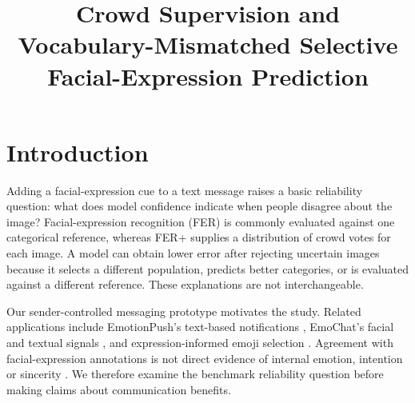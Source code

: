 \documentclass[pdflatex,sn-mathphys-num]{sn-jnl}
\begin{document}
\title[Crowd supervision and selective prediction]{Crowd Supervision and Vocabulary-Mismatched Selective Facial-Expression Prediction}
\author[1]{ }
\author[2]{ }
\author*[3]{ }
\author[4]{ }
\abstract{}
\maketitle

\section{Introduction}
Adding a facial-expression cue to a text message raises a basic reliability question: what does model confidence indicate when people disagree about the image? Facial-expression recognition (FER) is commonly evaluated against one categorical reference, whereas FER+ supplies a distribution of crowd votes for each image. A model can obtain lower error after rejecting uncertain images because it selects a different population, predicts better categories, or is evaluated against a different reference. These explanations are not interchangeable.

Our sender-controlled messaging prototype motivates the study. Related applications include EmotionPush's text-based notifications \cite{wang2016emotionpush}, EmoChat's facial and textual signals \cite{chong2019emochat}, and expression-informed emoji selection \cite{liu2019selfawareness}. Agreement with facial-expression annotations is not direct evidence of internal emotion, intention or sincerity \cite{barrett2019emotions}. We therefore examine the benchmark reliability question before making claims about communication benefits.
\end{document}
